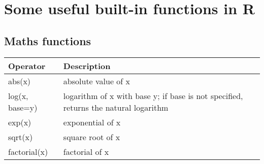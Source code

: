 \documentclass[
]{book}
\begin{document}
\hypertarget{some-useful-built-in-functions-in-r}{%
\section{Some useful built-in functions in R}\label{some-useful-built-in-functions-in-r}}

\hypertarget{maths-functions}{%
\subsection{Maths functions}\label{maths-functions}}

\begin{longtable}[]{@{}ll@{}}
\toprule
\begin{minipage}[b]{0.47\columnwidth}\raggedright
Operator\strut
\end{minipage} & \begin{minipage}[b]{0.47\columnwidth}\raggedright
Description\strut
\end{minipage}\tabularnewline
\midrule
\endhead
\begin{minipage}[t]{0.47\columnwidth}\raggedright
abs(x)\strut
\end{minipage} & \begin{minipage}[t]{0.47\columnwidth}\raggedright
absolute value of x\strut
\end{minipage}\tabularnewline
\begin{minipage}[t]{0.47\columnwidth}\raggedright
log(x, base=y)\strut
\end{minipage} & \begin{minipage}[t]{0.47\columnwidth}\raggedright
logarithm of x with base y; if base is not specified, returns the natural logarithm\strut
\end{minipage}\tabularnewline
\begin{minipage}[t]{0.47\columnwidth}\raggedright
exp(x)\strut
\end{minipage} & \begin{minipage}[t]{0.47\columnwidth}\raggedright
exponential of x\strut
\end{minipage}\tabularnewline
\begin{minipage}[t]{0.47\columnwidth}\raggedright
sqrt(x)\strut
\end{minipage} & \begin{minipage}[t]{0.47\columnwidth}\raggedright
square root of x\strut
\end{minipage}\tabularnewline
\begin{minipage}[t]{0.47\columnwidth}\raggedright
factorial(x)\strut
\end{minipage} & \begin{minipage}[t]{0.47\columnwidth}\raggedright
factorial of x\strut
\end{minipage}\tabularnewline
\bottomrule
\end{longtable}
\end{document}
